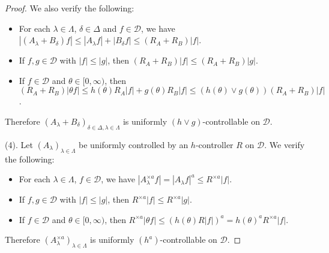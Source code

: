 \documentclass[12pt,a4paper]{amsart}
\theoremstyle{plain}
\theoremstyle{definition}
\numberwithin{equation}{section}
\begin{document}
\begin{proof}
    We also verify the following:
\begin{itemize}
\item
    For each $\lambda \in \Lambda$, $\delta \in \Delta$ and $f\in \mathcal D$, we have $|(A_\lambda + B_\delta) f| \leq |A_\lambda f| + |B_\delta f| \leq (R_A + R_B) |f|$.
\item
    If $f,g \in \mathcal D$ with $|f|\leq |g|$, then $(R_A + R_B)|f| \leq (R_A + R_B) |g|$.
\item
    If $f \in \mathcal D$ and $\theta \in [0,\infty)$, then $(R_A + R_B) |\theta f| \leq h(\theta) R_A|f| + g(\theta) R_B|f| \leq (h(\theta) \vee g(\theta)) (R_A+R_B)|f| $.
\end{itemize}
    Therefore $(A_\lambda + B_\delta)_{\delta\in \Delta, \lambda \in \Lambda}$ is uniformly $(h \vee g)$-controllable on $\mathcal D$.

    (4). Let $(A_\lambda)_{\lambda\in\Lambda}$ be uniformly controlled by an $h$-controller $R$ on $\mathcal D$.
    We verify the following:
\begin{itemize}
\item
    For each $\lambda \in \Lambda$, $f\in \mathcal D$, we have $|A_\lambda^{\times a} f| = |A_\lambda f|^a  \leq R^{\times a} |f|$.
\item
    If $f,g \in \mathcal D$ with $|f|\leq |g|$, then $R^{\times a}|f| \leq R^{\times a} |g|$.
\item
    If $f \in \mathcal D$ and $\theta \in [0,\infty)$, then $R^{\times a}|\theta f| \leq (h(\theta) R |f|)^a = h(\theta)^a R^{\times a}|f|$.
\end{itemize}
    Therefore $(A_\lambda^{\times a})_{\lambda \in \Lambda}$ is uniformly $(h^a)$-controllable on $\mathcal D$.
\end{proof}
\end{document}
